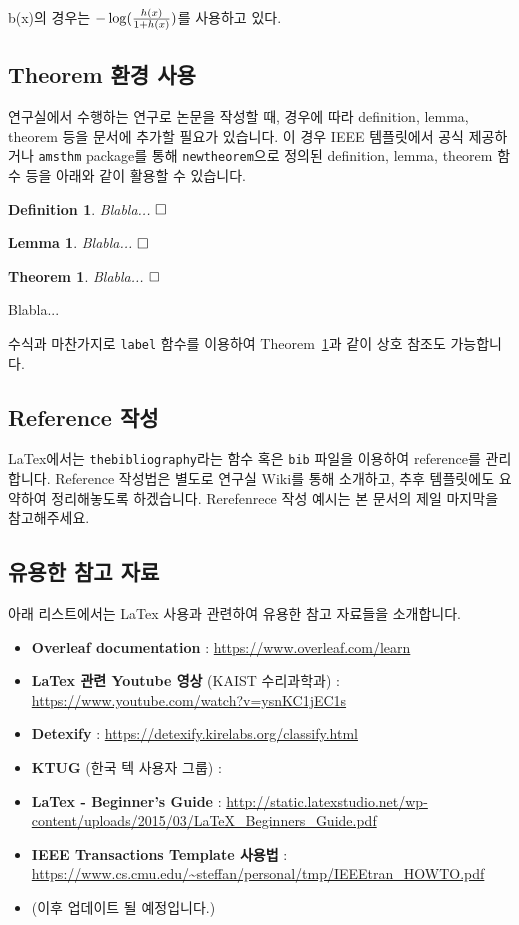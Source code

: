 \documentclass[journal]{IEEEtran}
\newtheorem{theorem}{Theorem}    %
\newtheorem{definition}{Definition} %
\newtheorem{lemma}{Lemma}    %
\begin{document}
b(x)의 경우는 $-\log({h(x) \over 1+h(x)})$를 사용하고 있다. 


\subsection{Theorem 환경 사용}

연구실에서 수행하는 연구로 논문을 작성할 때, 경우에 따라 definition, lemma, theorem 등을 문서에 추가할 필요가 있습니다. 
이 경우 IEEE 템플릿에서 공식 제공하거나 {\tt amsthm} package를 통해 {\tt newtheorem}으로 정의된 definition, lemma, theorem 함수 등을 아래와 같이 활용할 수 있습니다. 

\begin{definition}
    Blabla... $\hfill\square$
\end{definition}

\begin{lemma}
    Blabla... $\hfill\square$
\end{lemma}

\begin{theorem}\label{thm:Dummy}
Blabla... $\hfill\square$
\end{theorem}
\begin{IEEEproof}
    Blabla...
\end{IEEEproof}

수식과 마찬가지로 {\tt label} 함수를 이용하여 Theorem~\ref{thm:Dummy}과 같이 상호 참조도 가능합니다.

\subsection{Reference 작성}

LaTex에서는 {\tt thebibliography}라는 함수 혹은 {\tt bib} 파일을 이용하여 reference를 관리합니다. 
Reference 작성법은 별도로 연구실 Wiki를 통해 소개하고, 추후 템플릿에도 요약하여 정리해놓도록 하겠습니다. 
Rerefenrece 작성 예시는 본 문서의 제일 마지막을 참고해주세요. 

\subsection{유용한 참고 자료}

아래 리스트에서는 LaTex 사용과 관련하여 유용한 참고 자료들을 소개합니다. 
\begin{itemize}
\item {\bf Overleaf documentation} : \url{https://www.overleaf.com/learn}
\item {\bf LaTex 관련 Youtube 영상} (KAIST 수리과학과) : {\url{https://www.youtube.com/watch?v=ysnKC1jEC1s}}
\item {\bf Detexify} : \url{https://detexify.kirelabs.org/classify.html}
\item {\bf KTUG} (한국 텍 사용자 그룹) : 
\item {\bf LaTex - Beginner's Guide} : {\url{http://static.latexstudio.net/wp-content/uploads/2015/03/LaTeX_Beginners_Guide.pdf}}
\item {\bf IEEE Transactions Template 사용법 }: \url{https://www.cs.cmu.edu/~steffan/personal/tmp/IEEEtran_HOWTO.pdf}
\item (이후 업데이트 될 예정입니다.)
\end{itemize}
\end{document}
